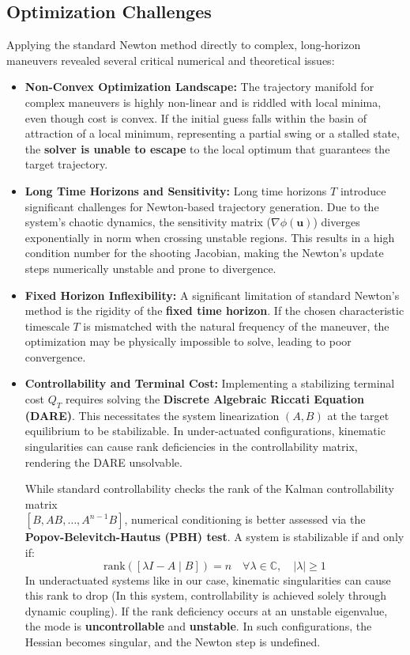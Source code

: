 \subsection{Optimization Challenges}
Applying the standard Newton method directly to complex, long-horizon maneuvers revealed several critical numerical and theoretical issues:

\begin{itemize}
    \item \textbf{Non-Convex Optimization Landscape:} The trajectory manifold for complex maneuvers is highly non-linear and is riddled with local minima, even though cost is convex. If the initial guess falls within the basin of attraction of a local minimum, representing a partial swing or a stalled state, the \textbf{solver is unable to escape} to the local optimum that guarantees the target trajectory.
    
    \item \textbf{Long Time Horizons and Sensitivity:} Long time horizons $T$ introduce significant challenges for Newton-based trajectory generation. Due to the system's chaotic dynamics, the sensitivity matrix ($\nabla \phi(\textbf{u})$) diverges exponentially in norm when crossing unstable regions. This results in a high condition number for the shooting Jacobian, making the Newton's update steps numerically unstable and prone to divergence. 

    \item \textbf{Fixed Horizon Inflexibility:} A significant limitation of standard Newton's method is the rigidity of the \textbf{fixed time horizon}. If the chosen characteristic timescale $T$ is mismatched with the natural frequency of the maneuver, the optimization may be physically impossible to solve, leading to poor convergence.

    \item \textbf{Controllability and Terminal Cost:} Implementing a stabilizing terminal cost $Q_T$ requires solving the \textbf{Discrete Algebraic Riccati Equation (DARE)}. This necessitates the system linearization $(A, B)$ at the target equilibrium to be stabilizable. In under-actuated configurations, kinematic singularities can cause rank deficiencies in the controllability matrix, rendering the DARE unsolvable.

    \par While standard controllability checks the rank of the Kalman controllability matrix \\
    $[B, AB, \dots, A^{n-1}B]$, numerical conditioning is better assessed via the \textbf{Popov-Belevitch-Hautus (PBH) test}. A system is stabilizable if and only if:
    \begin{equation}
    \text{rank}([\lambda I - A \mid B]) = n \quad \forall \lambda \in \mathbb{C}, \quad |\lambda| \ge 1
    \end{equation}
    In underactuated systems like in our case, kinematic singularities can cause this rank to drop (In this system, controllability is achieved solely through dynamic coupling). If the rank deficiency occurs at an unstable eigenvalue, the mode is \textbf{uncontrollable} and \textbf{unstable}. In such configurations, the Hessian becomes singular, and the Newton step is undefined.


\end{itemize}
